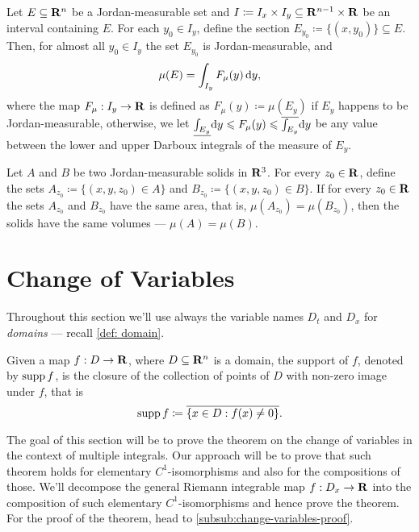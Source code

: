 \begin{corollary}
\label{cor:slicing-measurable-sets-and-integrating}
Let \(E \subseteq \mathbf{R}^n\) be a Jordan-measurable set and \(I \coloneq I_x \times
I_y \subseteq \mathbf{R}^{n-1} \times \mathbf{R}\) be an interval containing \(E\). For each
\(y_0 \in I_y\), define the section \(E_{y_0} \coloneq \{(x, y_{0})\} \subseteq
E\). Then, for almost all \(y_0 \in I_y\) the set \(E_{y_0}\) is
Jordan-measurable, and
\[
  \mu(E) = \int_{I_y} F_{\mu}(y)\, \mathrm{d} y,
\]
where the map \(F_{\mu}: I_y \to \mathbf{R}\) is defined as \(F_{\mu}(y) \coloneq
\mu(E_y)\) if \(E_y\) happens to be Jordan-measurable, otherwise, we let
\(\underline{\int_{E_y}} \mathrm{d} y \leqslant F_{\mu}(y) \leqslant \overline{\int_{E_y}}
\mathrm{d} y\) be any value between the lower and upper Darboux integrals of the
measure of \(E_y\).
\end{corollary}

\begin{corollary}
\label{cor:cavalieri-principle}
Let \(A\) and \(B\) be two Jordan-measurable solids in \(\mathbf{R}^3\). For every \(z_0
\in \mathbf{R}\), define the sets \(A_{z_0} \coloneq \{(x, y, z_{0}) \in A\}\) and
\(B_{z_0} \coloneq \{(x, y, z_{0}) \in B\}\). If for every \(z_0 \in \mathbf{R}\) the
sets \(A_{z_0}\) and \(B_{z_0}\) have the same area, that is, \(\mu(A_{z_0}) =
\mu(B_{z_0})\), then the solids have the same volumes --- \(\mu(A) = \mu(B)\).
\end{corollary}

\section{Change of Variables}

\begin{remark}
Throughout this section we'll use always the variable names \(D_t\) and \(D_x\)
for \emph{domains} --- recall \cref{def: domain}.
\end{remark}

\begin{definition}
\label{def:support-real-valued-map}
Given a map \(f: D \to \mathbf{R}\), where \(D \subseteq \mathbf{R}^n\) is a domain, the support
of \(f\), denoted by \(\operatorname{supp} f\), is the closure of the collection of points of
\(D\) with non-zero image under \(f\), that is
\[
  \operatorname{supp} f \coloneq \overline{\{x \in D : f(x) \neq 0\}}.
\]
\end{definition}

The goal of this section will be to prove the theorem on the change of variables
in the context of multiple integrals. Our approach will be to prove that such
theorem holds for elementary \(C^1\)-isomorphisms and also for the compositions
of those. We'll decompose the general Riemann integrable map \(f: D_x \to \mathbf{R}\)
into the composition of such elementary \(C^1\)-isomorphisms and hence prove the
theorem. For the proof of the theorem, head to
\cref{subsub:change-variables-proof}.

